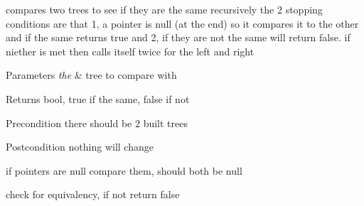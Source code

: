 compares two trees to see if they are the same recursively the 2 stopping conditions are that 1, a pointer is null (at the end) so it compares it to the other and if the same returns true and 2, if they are not the same will return false. if niether is met then calls itself twice for the left and right 
\begin{DoxyParams}{Parameters}
{\em the} & tree to compare with \\
\hline
\end{DoxyParams}
\begin{DoxyReturn}{Returns}
bool, true if the same, false if not
\end{DoxyReturn}
\begin{DoxyPrecond}{Precondition}
there should be 2 built trees 
\end{DoxyPrecond}
\begin{DoxyPostcond}{Postcondition}
nothing will change 
\end{DoxyPostcond}
if pointers are null compare them, should both be null

check for equivalency, if not return false

